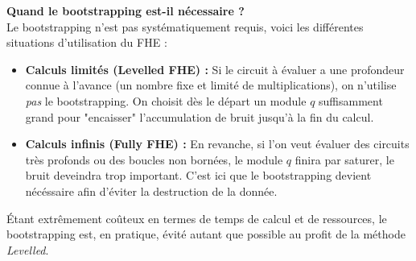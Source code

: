 \textbf{Quand le bootstrapping est-il nécessaire ?} \\
Le bootstrapping n'est pas systématiquement requis, voici les différentes situations d'utilisation du FHE :
\begin{itemize}
    \item \textbf{Calculs limités (Levelled FHE) :} Si le circuit à évaluer a une profondeur connue à l'avance (un nombre fixe et limité de multiplications), on n'utilise \emph{pas} le bootstrapping. On choisit dès le départ un module $q$ suffisamment grand pour "encaisser" l'accumulation de bruit jusqu'à la fin du calcul.
    \item \textbf{Calculs infinis (Fully FHE) :} En revanche, si l'on veut évaluer des circuits très profonds ou des boucles non bornées, le module $q$ finira par saturer, le bruit deveindra trop important. C'est ici que le bootstrapping devient nécéssaire afin d'éviter la destruction de la donnée.
\end{itemize}

Étant extrêmement coûteux en termes de temps de calcul et de ressources, le bootstrapping est, en pratique, évité autant que possible au profit de la méthode \emph{Levelled}.